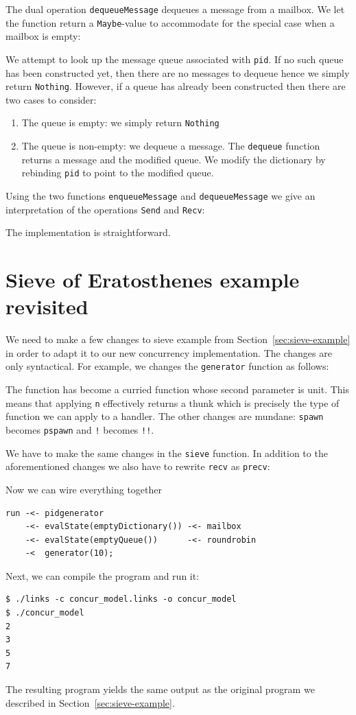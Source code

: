 \documentclass[12pt,mscres,cdtppar,twoside,openright,logo,rightchapter,normalheadings]{infthesis}
\newcommand{\snippet}[1]{}
\theoremstyle{definition}
\newcommand{\todo}[1]{{\par\noindent\small\color{red} \framebox{\parbox{\dimexpr\linewidth-2\fboxsep-2\fboxrule}{\textbf{TODO:} #1}}}}
\begin{document}
The dual operation \lstinline$dequeueMessage$ dequeues a message from
a mailbox. We let the function return a \lstinline$Maybe$-value to
accommodate for the special case when a mailbox is empty:
%
\snippet{dequeueMessage.links}
%
We attempt to look up the message queue associated with
\lstinline$pid$. If no such queue has been constructed yet, then there
are no messages to dequeue hence we simply return
\lstinline$Nothing$. However, if a queue has already been constructed
then there are two cases to consider:
\begin{enumerate}
  \item The queue is empty: we simply return \lstinline$Nothing$
  \item The queue is non-empty: we dequeue a message. The
    \lstinline$dequeue$ function returns a message and the modified
    queue. We modify the dictionary by rebinding \lstinline$pid$ to
    point to the modified queue.
\end{enumerate}

Using the two functions \lstinline$enqueueMessage$ and
\lstinline$dequeueMessage$ we give an interpretation of the operations
\lstinline$Send$ and \lstinline$Recv$:
%

%
The implementation is straightforward.
\todo{Implement amendments}

\section{Sieve of Eratosthenes example revisited}
\label{sec:links-model-handlers-example}

We need to make a few changes to sieve example from
Section~\ref{sec:sieve-example} in order to adapt it to our new
concurrency implementation. The changes are only syntactical. For
example, we changes the \lstinline$generator$ function as follows:
%

%
The function has become a curried function whose second parameter is
unit. This means that applying \lstinline$n$ effectively returns a
thunk which is precisely the type of function we can apply to a
handler. The other changes are mundane: \lstinline$spawn$ becomes
\lstinline$pspawn$ and \lstinline$!$ becomes \lstinline$!!$.

We have to make the same changes in the \lstinline$sieve$ function. In
addition to the aforementioned changes we also have to rewrite
\lstinline$recv$ as \lstinline$precv$:
%

%
Now we can wire everything together
%
\begin{lstlisting}
run -<- pidgenerator
    -<- evalState(emptyDictionary()) -<- mailbox 
    -<- evalState(emptyQueue())      -<- roundrobin 
    -<  generator(10);
\end{lstlisting}
Next, we can compile the program and run it:
\begin{lstlisting}
$ ./links -c concur_model.links -o concur_model
$ ./concur_model
2
3
5
7
\end{lstlisting}
The resulting program yields the same output as the original program
we described in Section~\ref{sec:sieve-example}.
\end{document}
